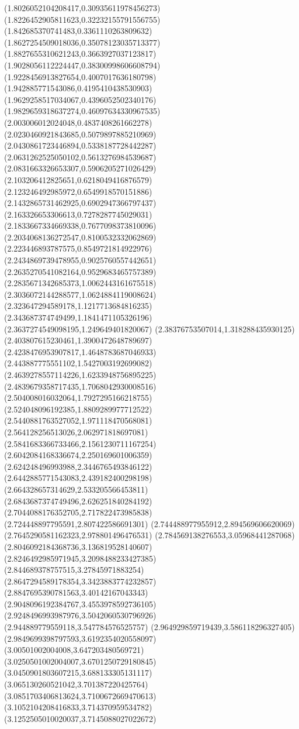 {(1.8026052104208417,0.30935611978456273)
(1.8226452905811623,0.32232155791556755)
(1.842685370741483,0.3361110263809632)
(1.8627254509018036,0.35078123035713377)
(1.8827655310621243,0.3663927037123817)
(1.9028056112224447,0.38300998606608794)
(1.9228456913827654,0.4007017636180798)
(1.942885771543086,0.4195410438530903)
(1.9629258517034067,0.4396052502340176)
(1.9829659318637274,0.46097634330967535)
(2.003006012024048,0.4837408261662278)
(2.0230460921843685,0.5079897885210969)
(2.0430861723446894,0.5338187728442287)
(2.0631262525050102,0.5613276984539687)
(2.0831663326653307,0.5906205271026429)
(2.103206412825651,0.6218049416876579)
(2.123246492985972,0.6549918570151886)
(2.1432865731462925,0.6902947366797437)
(2.163326653306613,0.7278287745029031)
(2.1833667334669338,0.7677098373810096)
(2.2034068136272547,0.8100532332062869)
(2.223446893787575,0.8549721814922976)
(2.2434869739478955,0.9025760557442651)
(2.2635270541082164,0.9529683465757389)
(2.2835671342685373,1.0062443161675518)
(2.3036072144288577,1.0624884119008624)
(2.323647294589178,1.1217713684816235)
(2.343687374749499,1.1841471105326196)
(2.3637274549098195,1.249649401820067)
(2.38376753507014,1.318288435930125)
(2.403807615230461,1.3900472648789697)
(2.4238476953907817,1.4648783687046933)
(2.443887775551102,1.5427003192699082)
(2.4639278557114226,1.6233948756895225)
(2.4839679358717435,1.7068042930008516)
(2.504008016032064,1.7927295166218755)
(2.524048096192385,1.8809289977712522)
(2.5440881763527052,1.971118470568081)
(2.564128256513026,2.062971818697081)
(2.5841683366733466,2.1561230711167254)
(2.6042084168336674,2.250169601006359)
(2.624248496993988,2.3446765493846122)
(2.6442885771543083,2.439182400298198)
(2.664328657314629,2.533205566453811)
(2.6843687374749496,2.626251840284192)
(2.7044088176352705,2.717822473985838)
(2.724448897795591,2.807422586691301)
(2.744488977955912,2.894569606620069)
(2.7645290581162323,2.978801496476531)
(2.784569138276553,3.05968441287068)
(2.8046092184368736,3.136819528140607)
(2.8246492985971945,3.2098488233427385)
(2.844689378757515,3.27845971883254)
(2.8647294589178354,3.3423883774232857)
(2.8847695390781563,3.40142167043343)
(2.9048096192384767,3.4553978592736105)
(2.9248496993987976,3.5042060530796926)
(2.944889779559118,3.547784576525757)
(2.964929859719439,3.586118296327405)
(2.9849699398797593,3.6192354020558097)
(3.00501002004008,3.647203480569721)
(3.0250501002004007,3.6701250729180845)
(3.0450901803607215,3.688133305131117)
(3.065130260521042,3.701387220425764)
(3.0851703406813624,3.7100672669470613)
(3.1052104208416833,3.714370959534782)
(3.1252505010020037,3.7145088027022672)
}

